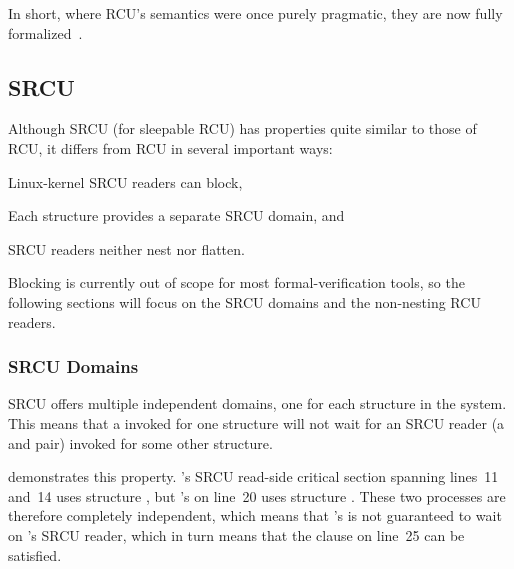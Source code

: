 \QuickQuizEnd

In short, where RCU's semantics were once purely pragmatic, they are
now fully
formalized~\cite{PaulMcKenney2005RCUSemantics,MathieuDesnoyers2012URCU,AlexeyGotsman2013ESOPRCU,Alglave:2018:FSC:3173162.3177156}.

\subsection{SRCU}
\label{sec:memorder:SRCU}

Although SRCU (for sleepable RCU) has properties quite similar to those
of RCU, it differs from RCU in several important ways:
\begin{enumerate*}[(1)]
\item	Linux-kernel SRCU readers can block,
\item	Each  structure provides a separate SRCU domain, and
\item	SRCU readers neither nest nor flatten.
\end{enumerate*}

Blocking is currently out of scope for most formal-verification tools, so
the following sections will focus on the SRCU domains and the non-nesting
RCU readers.

\subsubsection{SRCU Domains}
\label{sec:memorder:SRCU Domains}

SRCU offers multiple independent domains, one for each 
structure in the system.
This means that a  invoked for one 
structure will not wait for an SRCU reader (a  and
 pair) invoked for some other 
structure.

\begin{listing}

\caption{SRCU Domains}
\label{lst:memorder:SRCU Domains}
\end{listing}

demonstrates this property.
's SRCU read-side critical section spanning lines~11
and~14 uses  structure , but 's
 on line~20 uses  structure
.
These two processes are therefore completely independent, which means
that 's  is not guaranteed to wait
on 's SRCU reader, which in turn means that the 
clause on line~25 can be satisfied.

